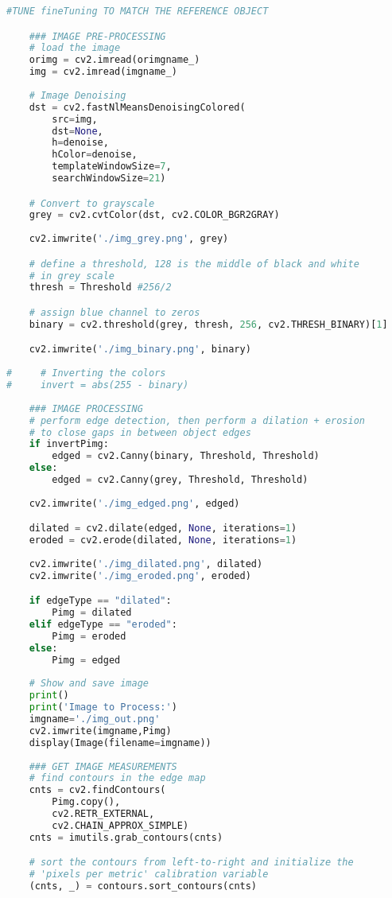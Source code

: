 \begin{lstlisting}[language=Python, caption=Image Analysis Source Code, label=lis:imageAnalysisSourceCode]
    #TUNE fineTuning TO MATCH THE REFERENCE OBJECT

    ### IMAGE PRE-PROCESSING
    # load the image
    orimg = cv2.imread(orimgname_)
    img = cv2.imread(imgname_)
    
    # Image Denoising
    dst = cv2.fastNlMeansDenoisingColored(
        src=img,
        dst=None,
        h=denoise,
        hColor=denoise,
        templateWindowSize=7,
        searchWindowSize=21)

    # Convert to grayscale
    grey = cv2.cvtColor(dst, cv2.COLOR_BGR2GRAY)
    
    cv2.imwrite('./img_grey.png', grey)

    # define a threshold, 128 is the middle of black and white
    # in grey scale
    thresh = Threshold #256/2

    # assign blue channel to zeros
    binary = cv2.threshold(grey, thresh, 256, cv2.THRESH_BINARY)[1]

    cv2.imwrite('./img_binary.png', binary)
    
#     # Inverting the colors
#     invert = abs(255 - binary)
    
    ### IMAGE PROCESSING
    # perform edge detection, then perform a dilation + erosion
    # to close gaps in between object edges
    if invertPimg:
        edged = cv2.Canny(binary, Threshold, Threshold)
    else:
        edged = cv2.Canny(grey, Threshold, Threshold)
        
    cv2.imwrite('./img_edged.png', edged)

    dilated = cv2.dilate(edged, None, iterations=1)
    eroded = cv2.erode(dilated, None, iterations=1)
    
    cv2.imwrite('./img_dilated.png', dilated)
    cv2.imwrite('./img_eroded.png', eroded)

    if edgeType == "dilated":
        Pimg = dilated
    elif edgeType == "eroded":
        Pimg = eroded
    else:
        Pimg = edged
    
    # Show and save image
    print()
    print('Image to Process:')
    imgname='./img_out.png'
    cv2.imwrite(imgname,Pimg)
    display(Image(filename=imgname))
    
    ### GET IMAGE MEASUREMENTS
    # find contours in the edge map
    cnts = cv2.findContours(
        Pimg.copy(),
        cv2.RETR_EXTERNAL,
        cv2.CHAIN_APPROX_SIMPLE)
    cnts = imutils.grab_contours(cnts)

    # sort the contours from left-to-right and initialize the
    # 'pixels per metric' calibration variable
    (cnts, _) = contours.sort_contours(cnts)
    

\end{lstlisting}
